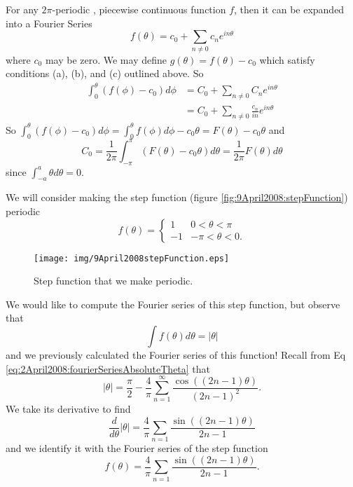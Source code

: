 For any $2\pi$-periodic , piecewise continuous function $f$,
then it can be expanded into a Fourier Series
\begin{equation}
f(\theta) = c_0 + \sum_{n\neq0}c_{n}e^{in\theta}
\end{equation}
where $c_0$ may be zero. We may define
$g(\theta)=f(\theta)-c_0$ which satisfy conditions (a), (b),
and (c) outlined above. So
\begin{subequations}
\begin{align}
\int^{\theta}_{0}(f(\phi)-c_{0})d\phi &= C_{0} +
\sum_{n\neq0}C_{n}e^{in\theta}\\
&= C_{0}+\sum_{n\neq0}\frac{c_{n}}{in}e^{in\theta}
\end{align}
\end{subequations}
So $\int^{\theta}_{0}(f(\phi)-c_0)d\phi =
\int^{\theta}_{0}f(\phi)d\phi - c_0\theta =
F(\theta)-c_0\theta$ and
\begin{equation}
C_{0} =
\frac{1}{2\pi}\int^{\pi}_{-\pi}(F(\theta)-c_{0}\theta)d\theta
= \frac{1}{2\pi}F(\theta)d\theta
\end{equation}
since $\int^{a}_{-a}\theta d\theta=0$. 
\begin{ex}
We will consider making the step function (figure \eqref{fig:9April2008:stepFunction}) periodic
\begin{equation}
f(\theta)=\begin{cases}1 & 0<\theta<\pi\\
-1 & -\pi<\theta<0.
\end{cases}
\end{equation}
\begin{figure}[!Ht]
  \begin{center}
    \texttt{[image: img/9April2008stepFunction.eps]}
  \end{center} 
  \caption[Step Function]{Step function that we make
    periodic.}
  \label{fig:9April2008:stepFunction}
\end{figure}
We would like to compute the Fourier series of this step
function, but observe that
\begin{equation}
\int f(\theta)d\theta = |\theta|
\end{equation}
and we previously calculated the Fourier series of this
function! Recall from Eq
\eqref{eq:2April2008:fourierSeriesAbsoluteTheta} that
\begin{equation}
|\theta| = \frac{\pi}{2} - \frac{4}{\pi}\sum^{\infty}_{n=1}\frac{\cos((2n-1)\theta)}{(2n-1)^2}.
\end{equation}
We take its derivative to find
\begin{equation}
\frac{d}{d\theta}|\theta| = \frac{4}{\pi}\sum_{n=1}\frac{\sin((2n-1)\theta)}{2n-1}
\end{equation}
and we identify it with the Fourier series of the step
function
\begin{equation}
f(\theta) = \frac{4}{\pi}\sum_{n=1}\frac{\sin((2n-1)\theta)}{2n-1}.
\end{equation}
\end{ex}

